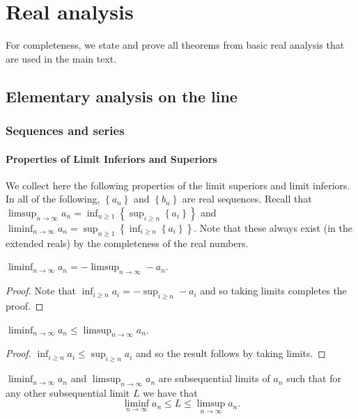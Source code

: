 
\chapter{Real analysis}

For completeness, we state and prove all theorems from basic real
analysis that are used in the main text.

\section{Elementary analysis on the line}

\subsection{Sequences and series}

\subsubsection{Properties of Limit Inferiors and Superiors}

We collect here the following properties of the limit superiors and
limit inferiors. In all of the following, $\left\{ a_{n}\right\} $
and $\left\{ b_{n}\right\} $ are real sequences. Recall that $\limsup_{n\to\infty}a_{n}=\inf_{n\geq1}\left\{ \sup_{i\geq n}\left\{ a_{i}\right\} \right\} $
and $\liminf_{n\to\infty}a_{n}=\sup_{n\geq1}\left\{ \inf_{i\geq n}\left\{ a_{i}\right\} \right\} $.
Note that these always exist (in the extended reals) by the completeness
of the real numbers.
\begin{prop}
\label{prop:.limInfNegLimSupNeg}$\liminf_{n\to\infty}a_{n}=-\limsup_{n\to\infty}-a_{n}$.
\end{prop}

\begin{proof}
Note that $\inf_{i\geq n}a_{i}=-\sup_{i\geq n}-a_{i}$ and so taking
limits completes the proof.
\end{proof}
\begin{prop}
\label{prop:limSupDominatesLimInf}$\liminf_{n\to\infty}a_{n}\leq\limsup_{n\to\infty}a_{n}$.
\end{prop}

\begin{proof}
$\inf_{i\geq n}a_{i}\leq\sup_{i\geq n}a_{i}$ and so the result follows
by taking limits.
\end{proof}
\begin{prop}
\label{prop:limSupSubsequential}$\liminf_{n\to\infty}a_{n}$ and
$\limsup_{n\to\infty}a_{n}$ are subsequential limits of $a_{n}$
such that for any other subsequential limit $L$ we have that 
\[
\liminf_{n\to\infty}a_{n}\leq L\leq\limsup_{n\to\infty}a_{n}.
\]
\end{prop}

